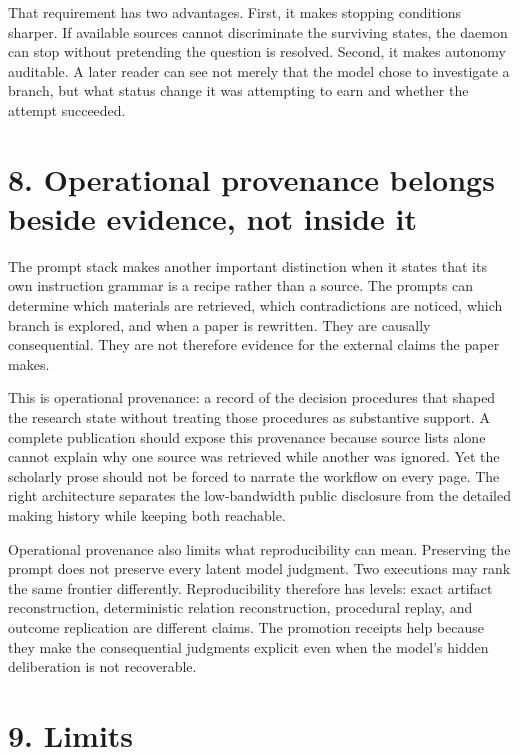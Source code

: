 \documentclass[11pt]{article}
\begin{document}
That requirement has two advantages. First, it makes stopping conditions sharper. If available sources cannot discriminate the surviving states, the daemon can stop without pretending the question is resolved. Second, it makes autonomy auditable. A later reader can see not merely that the model chose to investigate a branch, but what status change it was attempting to earn and whether the attempt succeeded.



\section*{8. Operational provenance belongs beside evidence, not inside it}



The prompt stack makes another important distinction when it states that its own instruction grammar is a recipe rather than a source. The prompts can determine which materials are retrieved, which contradictions are noticed, which branch is explored, and when a paper is rewritten. They are causally consequential. They are not therefore evidence for the external claims the paper makes.



This is operational provenance: a record of the decision procedures that shaped the research state without treating those procedures as substantive support. A complete publication should expose this provenance because source lists alone cannot explain why one source was retrieved while another was ignored. Yet the scholarly prose should not be forced to narrate the workflow on every page. The right architecture separates the low-bandwidth public disclosure from the detailed making history while keeping both reachable.



Operational provenance also limits what reproducibility can mean. Preserving the prompt does not preserve every latent model judgment. Two executions may rank the same frontier differently. Reproducibility therefore has levels: exact artifact reconstruction, deterministic relation reconstruction, procedural replay, and outcome replication are different claims. The promotion receipts help because they make the consequential judgments explicit even when the model’s hidden deliberation is not recoverable.



\section*{9. Limits}
\end{document}
